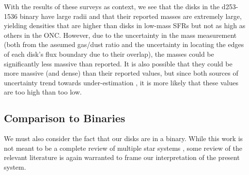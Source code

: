 With the results of these surveys as context, we see that the disks in the d253-1536 binary have large radii and that their reported masses are extremely large, yielding densities that are higher than disks in low-mass SFRs but not as high as others in the ONC. However, due to the uncertainty in the mass measurement (both from the assumed gas/dust ratio and the uncertainty in locating the edges of each disk's flux boundary due to their overlap), the masses could be significantly less massive than reported. It is also possible that they could be more massive (and dense) than their reported values, but since both sources of uncertainty trend towards under-estimation \citep[][showed that disks in Lupus were better represented by a 10:1 gas/dust ratio, and, as discussed in \S\ref{chap:results}, the integrated flux measurement that yields the disks' dust masses is likely over-counting emission]{Miotello2017}, it is more likely that these values are too high than too low.






\subsection{Comparison to Binaries}





We must also consider the fact that our disks are in a binary. While this work is not meant to be a complete review of multiple star systems \citep[for a more comprehensive review, see][]{DucheneKraus2013}, some review of the relevant literature is again warranted to frame our interpretation of the present system.

